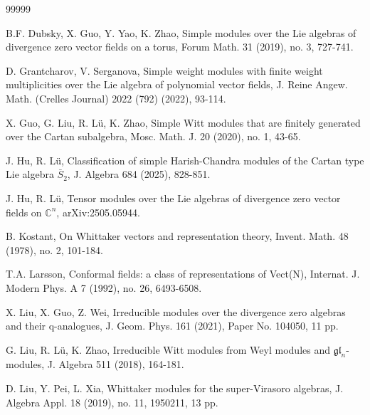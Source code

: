 \documentclass[12pt,a4paper]{amsart}
\def\C{\mathbb{C}}
\def\gl{\mathfrak{gl}}
\begin{document}
\begin{thebibliography}{99999}

B.F. Dubsky, X. Guo, Y. Yao, K. Zhao, Simple modules over the Lie algebras of divergence zero
vector fields on a torus, Forum Math. 31 (2019), no. 3, 727-741.

D. Grantcharov, V. Serganova, Simple weight modules with finite weight multiplicities over the Lie algebra of polynomial vector fields, J. Reine Angew. Math. (Crelles Journal) 2022 (792) (2022), 93-114.


X. Guo, G. Liu, R. L\"{u}, K. Zhao, Simple Witt modules that are finitely generated over the Cartan subalgebra, Mosc. Math. J. 20 (2020), no. 1, 43-65.



 J. Hu, R. L\"{u},
Classification of simple Harish-Chandra modules of the Cartan type Lie algebra $\bar{S}_2$, J. Algebra 684 (2025), 828-851.

 J. Hu, R. L\"{u},
Tensor modules over the Lie algebras of divergence zero vector fields on  $\C^n$, arXiv:2505.05944.



 B. Kostant, On Whittaker vectors and representation theory, Invent. Math. 48 (1978), no. 2, 101-184.


T.A. Larsson, Conformal fields: a class of representations of Vect(N), Internat. J. Modern Phys. A 7 (1992), no. 26, 6493-6508.

X. Liu, X. Guo, Z. Wei, Irreducible modules over the divergence zero algebras and their q-analogues,
J. Geom. Phys. 161 (2021), Paper No. 104050, 11 pp.

G. Liu, R. L\"{u}, K. Zhao, Irreducible Witt modules from Weyl modules and $\gl_n$-modules, J. Algebra 511 (2018), 164-181.

D. Liu, Y. Pei, L. Xia, Whittaker modules for the super-Virasoro algebras, J. Algebra Appl. 18 (2019), no. 11, 1950211, 13 pp.


\end{thebibliography}
\end{document}
